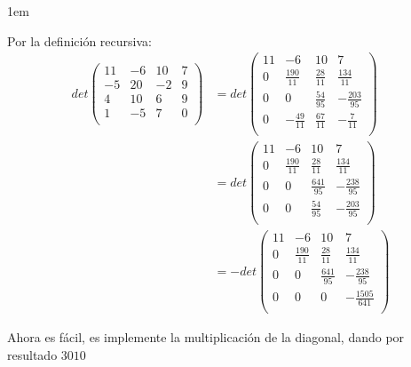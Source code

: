 \documentclass[12pt, fleqn]{article}                             %
\newenvironment{SmallIndentation}[1][0.75em]                    %
        {\begin{adjustwidth}{#1}{}\begin{footnotesize}}             %
        {\end{footnotesize}\end{adjustwidth}}                       %
\theoremstyle{break}                                            %
\newcommand{\pVector}[1]                                        %
        { \ensuremath{\begin{pmatrix}#1\end{pmatrix}} }             %
\begin{document}
\begin{itemize}
\begin{SmallIndentation}[1em]
                Por la definición recursiva:
                \begin{align*}
                    det \pVector{
                        11 & -6 & 10 & 7   \\ 
                        -5 & 20 & -2 & 9   \\
                        4  & 10 & 6 & 9    \\
                        1  & -5 & 7 & 0    \\
                        }
                    &=
                    det \pVector{
                        11 & -6 & 10 & 7   \\ 
                        0 & \frac{190}{11} & \frac{28}{11} & \frac{134}{11}   \\
                        0  & 0 & \frac{54}{95} & -\frac{203}{95}    \\
                        0  & -\frac{49}{11} & \frac{67}{11} & -\frac{7}{11}    \\
                        }\\
                    &=
                    det \pVector{
                        11 & -6 & 10 & 7   \\ 
                        0 & \frac{190}{11} & \frac{28}{11} & \frac{134}{11}   \\
                        0  & 0 & \frac{641}{95} & -\frac{238}{95}    \\
                        0  & 0 & \frac{54}{95} & -\frac{203}{95}    \\
                        }\\
                    &=
                    -det \pVector{
                        11 & -6 & 10 & 7   \\ 
                        0 & \frac{190}{11} & \frac{28}{11} & \frac{134}{11}   \\
                        0  & 0 & \frac{641}{95} & -\frac{238}{95}    \\
                        0  & 0 & 0 & -\frac{1505}{641}    \\
                        }
                \end{align*}

                Ahora es fácil, es implemente la multiplicación de la diagonal,
                dando por resultado $3010$
                
            \end{SmallIndentation}
                


    \end{itemize}
\end{document}

